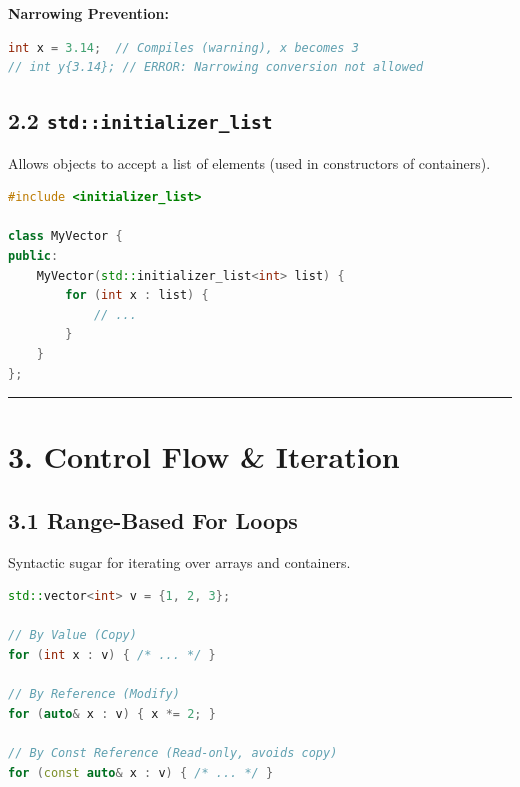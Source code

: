 \textbf{Narrowing Prevention:}

\begin{lstlisting}[language={C++}]
int x = 3.14;  // Compiles (warning), x becomes 3
// int y{3.14}; // ERROR: Narrowing conversion not allowed
\end{lstlisting}

\hypertarget{stdinitializer_list}{%
\subsection{\texorpdfstring{2.2
\texttt{std::initializer\_list}}{2.2 std::initializer\_list}}\label{stdinitializer_list}}

Allows objects to accept a list of elements (used in constructors of
containers).

\begin{lstlisting}[language={C++}]
#include <initializer_list>

class MyVector {
public:
    MyVector(std::initializer_list<int> list) {
        for (int x : list) {
            // ...
        }
    }
};
\end{lstlisting}

\begin{center}\rule{0.5\linewidth}{0.5pt}\end{center}

\hypertarget{control-flow-iteration}{%
\section{3. Control Flow \& Iteration}\label{control-flow-iteration}}

\hypertarget{range-based-for-loops}{%
\subsection{3.1 Range-Based For Loops}\label{range-based-for-loops}}

Syntactic sugar for iterating over arrays and containers.

\begin{lstlisting}[language={C++}]
std::vector<int> v = {1, 2, 3};

// By Value (Copy)
for (int x : v) { /* ... */ }

// By Reference (Modify)
for (auto& x : v) { x *= 2; }

// By Const Reference (Read-only, avoids copy)
for (const auto& x : v) { /* ... */ }
\end{lstlisting}

